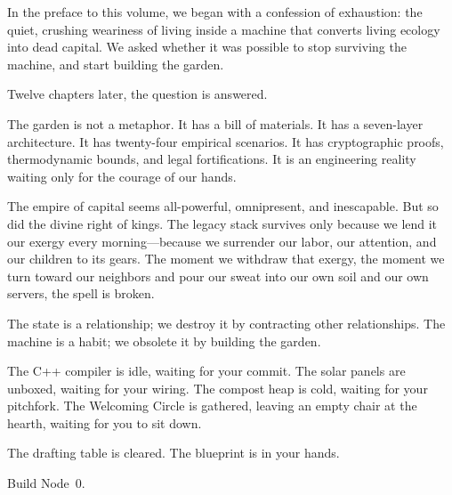 In the preface to this volume, we began with a confession of exhaustion: the quiet, crushing weariness of living inside a machine that converts living ecology into dead capital. We asked whether it was possible to stop surviving the machine, and start building the garden.

Twelve chapters later, the question is answered.

The garden is not a metaphor. It has a bill of materials. It has a seven-layer architecture. It has twenty-four empirical scenarios. It has cryptographic proofs, thermodynamic bounds, and legal fortifications. It is an engineering reality waiting only for the courage of our hands.

The empire of capital seems all-powerful, omnipresent, and inescapable. But so did the divine right of kings. The legacy stack survives only because we lend it our exergy every morning---because we surrender our labor, our attention, and our children to its gears. The moment we withdraw that exergy, the moment we turn toward our neighbors and pour our sweat into our own soil and our own servers, the spell is broken.

The state is a relationship; we destroy it by contracting other relationships. The machine is a habit; we obsolete it by building the garden.

The C++ compiler is idle, waiting for your commit. The solar panels are unboxed, waiting for your wiring. The compost heap is cold, waiting for your pitchfork. The Welcoming Circle is gathered, leaving an empty chair at the hearth, waiting for you to sit down.

The drafting table is cleared. The blueprint is in your hands.

Build Node~0.
